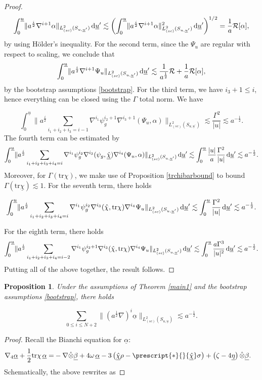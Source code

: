 \documentclass{amsart}
\newtheorem{proposition}{Proposition}[section]
\newcommand{\aln}{(\al \nabla)^i}
\newcommand{\ali}{a^{\frac{i}{2}}}
\newcommand{\hsp}{\hspace{.5mm}}
\newcommand{\dubarprime}{\hspace{.5mm} \text{d} \ubar^{\prime}}
\newcommand{\intubar}{\int_0^{\ubar}}
\newcommand{\chihat}{\hat{\chi}}
\newcommand{\al}{a^{\frac{1}{2}}}
\newcommand{\chibar}{\underline{\chi}}
\newcommand{\chibarhat}{\underline{\hat{\chi}}}
\newcommand{\ubar}{\underline{u}}
\newcommand{\sumitm}{\sum_{i_1+i_2+i_3=i-1}}
\newcommand{\sumif}{\sum_{i_1+i_2+i_3+i_4=i}}
\newcommand{\sumifim}{\sum_{i_1+i_2+i_3+i_4=i-2}}
\newcommand{\be}{\begin{equation}}
\newcommand{\ee}{\end{equation}}
\newcommand{\nablap}{\nabla^{i_1}\psi_g^{i_2}}
\newcommand{\nablapp}{\nabla^{i_1}\psi_g^{i_2+1}}
\newcommand{\scaletwoSu}[1]{\lVert{#1} \rVert_{L^2_{(sc)}(S_{u,\ubar})}}
\newcommand{\scaletwoSuubarprime}[1]{\lVert{#1} \rVert_{L^2_{(sc)}(S_{u,\ubar^\prime})}}
\newcommand{\alphabar}{\underline{\alpha}}
\newcommand{\betabar}{\underline{\beta}}
\newcommand{\etabar}{\underline{\eta}}
\newcommand{\nablat}{\nabla^{i_3}}
\newcommand{\nablaf}{\nabla^{i_4}}
\newcommand{\Hodge}[1]{\prescript{*}{}{#1}}
\newcommand{\tr}{\mbox{tr}}
\begin{document}
{\begin{proof}
\be \intubar \scaletwoSuubarprime{a^{\frac{i}{2}}\nabla^{i+1}\alpha} \dubarprime \lesssim \left(\intubar \scaletwoSuubarprime{a^{\frac{i}{2}}\nabla^{i+1}\alpha}^2 \dubarprime\right)^{1/2}= \frac{1}{a}\mathcal{R}[\alpha],\ee by using H\"older's inequality. For the second term, since the $\Psi_u$ are regular with respect to scaling, we conclude that 
 \be \intubar \scaletwoSuubarprime{a^{\frac{i}{2}}\nabla^{i+1}\Psi_u} \dubarprime \lesssim \frac{1}{\al} \mathcal{R}+\frac{1}{a}\mathcal{R}[\alpha],\ee by the bootstrap assumptions \eqref{bootstrap}. For the third term, we have $i_3+1 \leq i$, hence everything can be closed using the $\Gamma$ total norm. We have
 
 \be \intubar \scaletwoSuubarprime{\ali \sumitm \nablapp \nabla^{i_3+1}(\Psi_u, \alpha)} \lesssim \frac{\Gamma^2}{\lvert u \rvert} \lesssim a^{-\frac{1}{2}}.\ee The fourth term can be estimated by \be \intubar \scaletwoSuubarprime{a^{\frac{i}{2}}\sumif\nablap \nablat(\psi_g, \chibarhat)\nablaf(\Psi_u,\alpha)} \dubarprime\lesssim \intubar \frac{\lvert u \rvert}{a}\frac{\Gamma^2}{\lvert u \rvert} \dubarprime \lesssim a^{-\frac{1}{2}}.\ee 
  Moreover, for $\Gamma(\tr\chi)$, we make use of Proposition \ref{trchibarbound} to bound $\Gamma(\tr\chibar)\lesssim 1$. For the seventh term, there holds
 
 \begin{align}
     \intubar \scaletwoSuubarprime{\ali \sumif \nablap \nablat(\chihat, \tr\chi)\nablaf \Psi_u} \dubarprime \lesssim \intubar \frac{ \Gamma^2}{\lvert u \rvert}\dubarprime \lesssim a^{-\frac{1}{2}}.
 \end{align}
 
\noindent For the eighth term, there holds
 \begin{align}
   \intubar \scaletwoSuubarprime{\ali \sumifim \nablapp \nablat(\chihat, \tr\chi)\nablaf \Psi_u} \dubarprime \lesssim \intubar \frac{a \Gamma^3}{\lvert u \rvert^2}\dubarprime \lesssim a^{-\frac{1}{2}}.
\end{align}
Putting all of the above together, the result follows.
\end{proof}
\begin{proposition}
Under the assumptions of Theorem \ref{main1} and the bootstrap assumptions \eqref{bootstrap}, there holds

\[\sum_{0\leq i \leq N+2}\scaletwoSu{\aln \alphabar}\lesssim a^{-\frac{1}{2}}. \]
\end{proposition}
\begin{proof}
Recall the Bianchi equation for $\alphabar$:
	\begin{equation}
	    \begin{split}
	        \nabla_4 \alphabar + \frac{1}{2}\tr\chi \hsp \alphabar = &-\nabla \hat{\otimes}\betabar +4 \omega\hsp \alphabar -3\left(\chibarhat \rho - \Hodge{\chibarhat}\sigma \right) +\left(\zeta - 4\etabar\right)\hat{\otimes}\betabar .
	    \end{split}
\end{equation}
Schematically, the above rewrites as 


\end{proof}}
\end{document}
